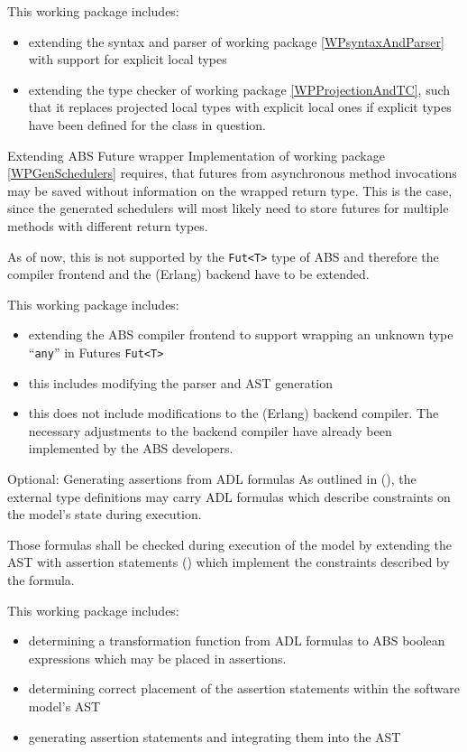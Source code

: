 \documentclass[paper=a4,nochapname,accentcolor=tud9c]{tudexercise}
\makeatletter
\newcommand\textcitep[1]{\mkbibparens{\textcite{#1}}}
\def\namedlabel#1#2{\begingroup
    #1%
    \def\@currentlabel{\thedescriptcount}%
    \phantomsection\label{#2}\endgroup
}
\newcounter{descriptcount}
\renewcommand*\thedescriptcount{[\Alph{descriptcount}]}}
\renewcommand*\thedescriptcount{\roman{descriptcount}}}
\makeatother
\begin{document}
\begin{enumdescript}
    This working package includes:
    \begin{itemize}
      \item extending the syntax and parser of working package \ref{WPsyntaxAndParser}
        with support for explicit local types
      \item extending the type checker of working package \ref{WPProjectionAndTC}, such
        that it replaces projected local types with explicit local ones if explicit types have been defined for the class in question.
    \end{itemize}
  \item[\namedlabel{Extending ABS Future wrapper}{WPAnyFut}]%
    Implementation of working package \ref{WPGenSchedulers} requires, that futures
    from asynchronous method invocations may be saved without information on the
    wrapped return type. This is the case, since the generated schedulers will
    most likely need to store futures for multiple methods with different return types.

    As of now, this is not supported by the \texttt{Fut<T>} type of ABS and
    therefore the compiler frontend and the (Erlang) backend have to be extended.

    This working package includes:
    \begin{itemize}
      \item extending the ABS compiler frontend to support wrapping an unknown
        type ``\texttt{any}'' in Futures \texttt{Fut<T>}
      \item this includes modifying the parser and AST generation
        \item this does not include modifications to the (Erlang) backend
          compiler. The necessary adjustments to the backend compiler have
          already been implemented by the ABS developers. %
    \end{itemize}
  \item[\namedlabel{Optional: Generating assertions from ADL formulas}{WPAssertions}]%
    As outlined in \textcitep{kamburjan2018stateful}, the external type definitions
    may carry ADL formulas which describe constraints on the model's state during 
    execution.

    Those formulas shall be checked during execution of the model by extending
    the AST with assertion statements \textcitep{absassertions} which implement the
    constraints described by the formula.

    This working package includes:
    \begin{itemize}
      \item determining a transformation function from ADL formulas to ABS
        boolean expressions which may be placed in assertions.
      \item determining correct placement of the assertion statements within
        the software model's AST
      \item generating assertion statements and integrating them into the AST
    \end{itemize}
\end{enumdescript}
\end{document}
